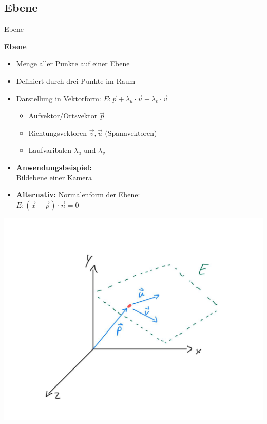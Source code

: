 \documentclass[10pt,aspectratio=169]{beamer}
\begin{document}
  \subsection{Ebene}
  \begin{frame}{Ebene}
    \begin{minipage}{8cm}
      \textbf{Ebene}
      \begin{itemize}
        \item Menge aller Punkte auf einer Ebene
        \item Definiert durch drei Punkte im Raum
        \item Darstellung in Vektorform: $E: \vec{p} + \lambda_u \cdot \vec{u} + \lambda_v \cdot \vec{v}$
        \begin{itemize}  
          \item Aufvektor/Ortsvektor $\vec{p}$
          \item Richtungsvektoren $\vec{v}, \vec{u}$ (Spannvektoren)
          \item Laufvaribalen $\lambda_u$ und $\lambda_v$
        \end{itemize}
        \item \textbf{Anwendungsbeispiel:}\\Bildebene einer Kamera
        \item \textbf{Alternativ:} Normalenform der Ebene:\\
        $E: (\vec{x} - \vec{p}) \cdot \vec{n} = 0$
      \end{itemize}  
    \end{minipage}
    \begin{minipage}{4cm}
      \includegraphics[scale=0.125]{sketch_ebene}
    \end{minipage}
  \end{frame}
\end{document}

